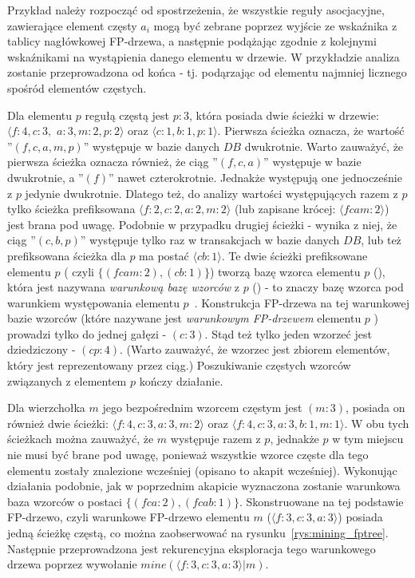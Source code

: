Przykład należy rozpocząć od spostrzeżenia, że wszystkie reguły asocjacyjne, zawierające element częsty $a_i$ mogą być zebrane poprzez wyjście ze wskaźnika z tablicy nagłówkowej FP-drzewa, a następnie podążając zgodnie z kolejnymi wskaźnikami na wystąpienia danego elementu w drzewie. W przykładzie analiza zostanie przeprowadzona od końca - tj. podąrzając od elementu najmniej licznego spośród elementów częstych.

Dla elementu $p$ regułą częstą jest $p: 3$, która posiada dwie ścieżki w drzewie: $\langle f: 4, c: 3,$ $a: 3, m: 2, p: 2\rangle$ oraz $\langle c: 1, b: 1, p: 1\rangle$. Pierwsza ścieżka oznacza, że wartość ''$( f, c, a, m, p )$'' występuje w bazie danych $DB$ dwukrotnie. Warto zauważyć, że pierwsza ścieżka oznacza również, że ciąg ''$( f, c, a )$'' występuje w bazie dwukrotnie, a ''$(f)$'' nawet czterokrotnie. Jednakże występują one jednocześnie z $p$ jedynie dwukrotnie. Dlatego też, do analizy wartości występujących razem z $p$ tylko ścieżka prefiksowana $\langle f: 2, c: 2, a: 2, m: 2\rangle$ (lub zapisane krócej: $\langle fcam: 2\rangle$) jest brana pod uwagę. Podobnie w przypadku drugiej ścieżki - wynika z niej, że ciąg ''$(c, b, p)$'' występuje tylko raz w transakcjach w bazie danych $DB$, lub też prefiksowana ścieżka dla $p$ ma postać $\langle cb: 1 \rangle$. Te dwie ścieżki prefiksowane elementu $p$ ( czyli $\lbrace ( fcam: 2 ), (cb: 1) \rbrace$) tworzą bazę wzorca elementu $p$ (), która jest nazywana \emph{warunkową bazę wzorców} z $p$ () - to znaczy bazę wzorca pod warunkiem występowania elementu $p$~\cite{Main:FPgrowth}. Konstrukcja FP-drzewa na tej warunkowej bazie wzorców (które nazywane jest \emph{warunkowym FP-drzewem} elementu $p$ ) prowadzi tylko do jednej gałęzi - $(c:3)$. Stąd też tylko jeden wzorzeć jest dziedziczony - $(cp:4)$. (Warto zauważyć, że wzorzec jest zbiorem elementów, który jest reprezentowany przez ciąg.) Poszukiwanie częstych wzorców związanych z elementem $p$ kończy działanie.

Dla wierzchołka $m$ jego bezpośrednim wzorcem częstym jest $(m:3)$, posiada on również dwie ścieżki: $\langle f: 4, c: 3, a: 3, m: 2 \rangle$ oraz $\langle f: 4, c: 3, a: 3, b: 1, m: 1 \rangle$. W obu tych ścieżkach można zauważyć, że $m$ występuje razem z $p$, jednakże $p$ w tym miejscu nie musi być brane pod uwagę, ponieważ wszystkie wzorce częste dla tego elementu zostały znalezione wcześniej (opisano to akapit wcześniej). Wykonując działania podobnie, jak w poprzednim akapicie wyznaczona zostanie warunkowa baza wzorców o postaci $\lbrace (fca: 2), (fcab: 1) \rbrace$. Skonstruowane na tej podstawie FP-drzewo, czyli warunkowe FP-drzewo elementu $m$ ($\langle f: 3, c: 3, a: 3 \rangle$) posiada jedną ścieżkę częstą, co można zaobserwować na rysunku~\ref{rys:mining_fptree}. Następnie przeprowadzona jest rekurencyjna eksploracja tego warunkowego drzewa poprzez wywołanie $mine(\langle f: 3, c: 3, a: 3 \rangle | m)$.

